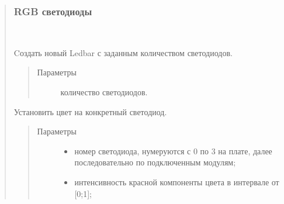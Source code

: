 \documentclass[a4paper,10pt,russian]{sphinxmanual}
\begin{document}
\begin{quote}
\begin{fulllineitems}
\begin{quote}
\begin{description}
\end{description}\end{quote}

\end{fulllineitems}



\subsubsection{RGB светодиоды}
\label{\detokenize{programming/lua/lua:rgb}}

\begin{fulllineitems}
\label{\detokenize{programming/lua/lua:Ledbar}}~

\begin{fulllineitems}
\label{\detokenize{programming/lua/lua:Ledbar.new}}
Cоздать новый Ledbar с заданным количеством светодиодов.
\begin{quote}\begin{description}
\item[{Параметры}] \leavevmode
{} \textendash{} количество светодиодов.

\end{description}\end{quote}

\end{fulllineitems}


\begin{fulllineitems}
\label{\detokenize{programming/lua/lua:Ledbar.set}}
Установить цвет на конкретный светодиод.
\begin{quote}\begin{description}
\item[{Параметры}] \leavevmode\begin{itemize}
\item {} 
 \textendash{} номер светодиода, нумеруются с 0 по 3 на плате, далее последовательно по подключенным модулям;

\item {} 
 \textendash{} интенсивность красной компоненты цвета в интервале от {[}0;1{]};


\end{itemize}
\end{description}
\end{quote}
\end{fulllineitems}
\end{fulllineitems}
\end{quote}
\end{document}
